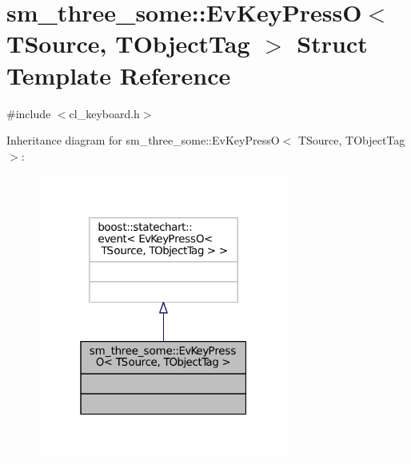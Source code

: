 \hypertarget{structsm__three__some_1_1EvKeyPressO}{}\section{sm\+\_\+three\+\_\+some\+:\+:Ev\+Key\+PressO$<$ T\+Source, T\+Object\+Tag $>$ Struct Template Reference}
\label{structsm__three__some_1_1EvKeyPressO}


{\ttfamily \#include $<$cl\+\_\+keyboard.\+h$>$}



Inheritance diagram for sm\+\_\+three\+\_\+some\+:\+:Ev\+Key\+PressO$<$ T\+Source, T\+Object\+Tag $>$\+:
\nopagebreak
\begin{figure}[H]
\begin{center}
\leavevmode
\includegraphics[width=235pt]{structsm__three__some_1_1EvKeyPressO__inherit__graph}
\end{center}
\end{figure}


